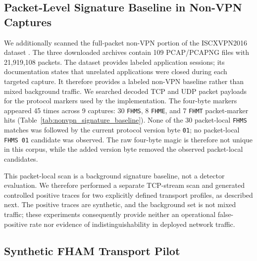 \documentclass[preprint,12pt]{elsarticle}
\theoremstyle{plain}
\begin{document}
\begin{table}[!t]
\centering
\caption{H0/H1 Traffic Detectability by Envelope Mode (1920 Traces per Mode, 70/30 Train/Test Split)}
\label{tab:traffic_detectability}
{\small\setlength{\tabcolsep}{4pt}}
\end{table}

\subsection{Packet-Level Signature Baseline in Non-VPN Captures}

We additionally scanned the full-packet non-VPN portion of the ISCXVPN2016
dataset \cite{drapergil2016iscx,unbiscx2016}. The three downloaded archives
contain 109 PCAP/PCAPNG files with 21,919,108 packets. The dataset provides
labeled application sessions; its documentation states that unrelated
applications were closed during each targeted capture. It therefore provides
a labeled non-VPN baseline rather than mixed background traffic. We searched
decoded TCP and UDP packet payloads for the protocol markers used by the
implementation. The four-byte markers appeared 45 times across 9 captures:
30 \texttt{FHMS}, 8 \texttt{FHME}, and 7 \texttt{FHMT} packet-marker hits
(Table~\ref{tab:nonvpn_signature_baseline}). None of the 30 packet-local
\texttt{FHMS} matches was followed by the current protocol version byte
\texttt{01}; no packet-local \texttt{FHMS\,01} candidate was observed. The raw
four-byte magic is therefore not unique in this corpus, while the added version
byte removed the observed packet-local candidates.

This packet-local scan is a background signature baseline, not a detector
evaluation. We therefore performed a separate TCP-stream scan and generated
controlled positive traces for two explicitly defined transport profiles, as
described next. The positive traces are synthetic, and the background set is
not mixed traffic; these experiments consequently provide neither an
operational false-positive rate nor evidence of indistinguishability in
deployed network traffic.

\begin{table}[H]
\centering
\small
\caption{Packet-Local FHAM Marker Scan in the ISCXVPN2016 Non-VPN Captures}
\label{tab:nonvpn_signature_baseline}

\end{table}

\subsection{Synthetic FHAM Transport Pilot}
\end{document}
